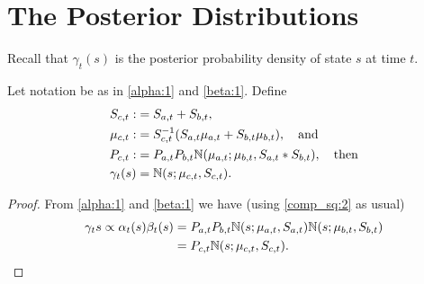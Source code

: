 \documentclass[12pt,leqno]{article}
\begin{document}
\section{The Posterior Distributions}
Recall that $\gamma_t(s)$ is the posterior probability density of state $s$
at time $t$. 
\begin{Thm}
  Let notation be as in \eqref{alpha:1} and \eqref{beta:1}.  Define
\begin{align*}
  S_{c,t} :&= S_{a,t} + S_{b,t}, \\
  \mu_{c,t} :&= S_{c,t}^{-1}(S_{a,t}\mu_{a,t} + S_{b,t}\mu_{b,t}), \quad\text{and}\\
  P_{c,t} :&= P_{a,t}P_{b,t}{\mathbb N}(\mu_{a,t};\mu_{b,t},S_{a,t}*S_{b,t}), \quad\text{then} \\
 \gamma_t(s) &= {\mathbb N}(s;\mu_{c,t},S_{c,t}).
  \end{align*}
\end{Thm}
\begin{proof}
  From \eqref{alpha:1} and \eqref{beta:1} we have (using \eqref{comp_sq:2}
  as usual)
  \begin{align*}
  \gamma_t{s} \propto \alpha_t(s)\beta_t(s) &= P_{a,t}P_{b,t}{\mathbb N}(s;\mu_{a,t},S_{a,t}){\mathbb N}(s;\mu_{b,t},S_{b,t})\\
  &= P_{c,t}{\mathbb N}(s;\mu_{c,t},S_{c,t}).
  \end{align*}
\end{proof}
\end{document}
